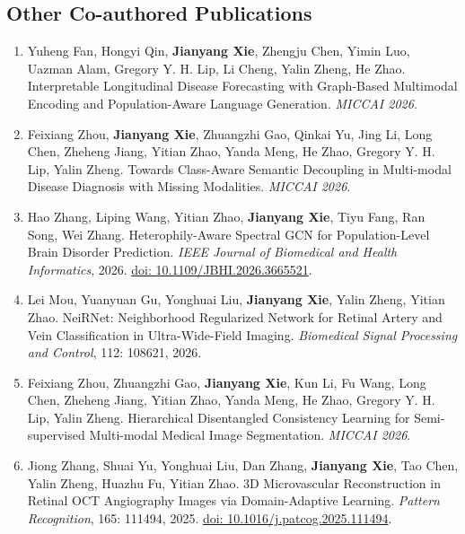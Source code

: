 \documentclass[11pt,a4paper]{article}
\begin{document}
\subsection*{Other Co-authored Publications}
\begin{enumerate}[label={\textcolor{accent}{\sffamily\footnotesize O\arabic*}},leftmargin=2.5em,itemsep=8pt,parsep=0pt]
\item Yuheng Fan, Hongyi Qin, \textbf{Jianyang Xie}, Zhengju Chen, Yimin Luo, Uazman Alam, Gregory Y. H. Lip, Li Cheng, Yalin Zheng, He Zhao. Interpretable Longitudinal Disease Forecasting with Graph-Based Multimodal Encoding and Population-Aware Language Generation. \textit{MICCAI 2026}.
\item Feixiang Zhou, \textbf{Jianyang Xie}, Zhuangzhi Gao, Qinkai Yu, Jing Li, Long Chen, Zheheng Jiang, Yitian Zhao, Yanda Meng, He Zhao, Gregory Y. H. Lip, Yalin Zheng. Towards Class-Aware Semantic Decoupling in Multi-modal Disease Diagnosis with Missing Modalities. \textit{MICCAI 2026}.
\item Hao Zhang, Liping Wang, Yitian Zhao, \textbf{Jianyang Xie}, Tiyu Fang, Ran Song, Wei Zhang. Heterophily-Aware Spectral GCN for Population-Level Brain Disorder Prediction. \textit{IEEE Journal of Biomedical and Health Informatics}, 2026. \href{https://doi.org/10.1109/JBHI.2026.3665521}{doi: 10.1109/JBHI.2026.3665521}.
\item Lei Mou, Yuanyuan Gu, Yonghuai Liu, \textbf{Jianyang Xie}, Yalin Zheng, Yitian Zhao. NeiRNet: Neighborhood Regularized Network for Retinal Artery and Vein Classification in Ultra-Wide-Field Imaging. \textit{Biomedical Signal Processing and Control}, 112: 108621, 2026.
\item Feixiang Zhou, Zhuangzhi Gao, \textbf{Jianyang Xie}, Kun Li, Fu Wang, Long Chen, Zheheng Jiang, Yitian Zhao, Yanda Meng, He Zhao, Gregory Y. H. Lip, Yalin Zheng. Hierarchical Disentangled Consistency Learning for Semi-supervised Multi-modal Medical Image Segmentation. \textit{MICCAI 2026}.
\item Jiong Zhang, Shuai Yu, Yonghuai Liu, Dan Zhang, \textbf{Jianyang Xie}, Tao Chen, Yalin Zheng, Huazhu Fu, Yitian Zhao. 3D Microvascular Reconstruction in Retinal OCT Angiography Images via Domain-Adaptive Learning. \textit{Pattern Recognition}, 165: 111494, 2025. \href{https://doi.org/10.1016/j.patcog.2025.111494}{doi: 10.1016/j.patcog.2025.111494}.

\end{enumerate}
\end{document}
